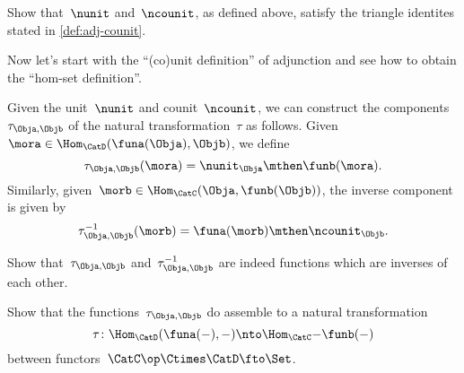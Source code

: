 \begin{exercise}
    \label{ex:eta-epsilon-triangle}
    Show that~$\nunit$ and~$\ncounit$, as defined above, satisfy the triangle identites stated in \cref{def:adj-counit}.
\end{exercise}
\begin{solution}
    \missingsolution
\end{solution}

Now let's start with the ``(co)unit definition'' of adjunction and see how to obtain the ``hom-set definition''.

Given the unit~$\nunit$ and counit~$\ncounit$, we can construct the components~$\tau_{\Obja,\Objb}$ of the natural transformation~$\tau$ as follows.
Given~$\mora \in \Hom_{\CatD}(\funa(\Obja),\Objb)$, we define
\begin{equation*}
    \tau_{\Obja,\Objb}(\mora) = \nunit_\Obja \mthen \funb(\mora).
\end{equation*}
Similarly, given~$\morb \in \Hom_{\CatC}(\Obja,\funb(\Objb))$, the inverse component is given by
\begin{equation*}
    \tau_{\Obja,\Objb}^{-1}(\morb) = \funa(\morb) \mthen \ncounit_\Objb.
\end{equation*}

\begin{exercise}
    \label{ex:tau}
    Show that~$\tau_{\Obja,\Objb}$ and~$\tau_{\Obja,\Objb}^{-1}$ are indeed functions which are inverses of each other.
\end{exercise}
\begin{solution}
    \missingsolution
\end{solution}

\begin{exercise}
    \label{ex:tau2}
    Show that the functions~$\tau_{\Obja,\Objb}$ do assemble to a natural transformation
    \begin{equation*}
        \tau  \colon \Hom_{\CatD}(\funa(-) ,- ) \nto \Hom_{\CatC}{-}{\funb(-)}
    \end{equation*}
    between functors~$\CatC\op \Ctimes \CatD \fto \Set $.
\end{exercise}
\begin{solution}
    \missingsolution
\end{solution}
